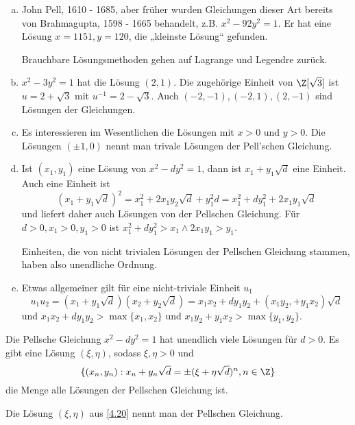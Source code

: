 \begin{nt} \label{4.19}
	\begin{enumerate}[a)]
		\item
			John Pell, 1610 - 1685, aber früher wurden Gleichungen dieser Art bereits von Brahmagupta, 1598 - 1665 behandelt, z.B. $x^2 - 92 y^2 = 1$.
			Er hat eine Lösung $x = 1151, y = 120$, die „kleinste Lösung“ gefunden.

			Brauchbare Lösungsmethoden gehen auf Lagrange und Legendre zurück.
		\item
			$x^2 - 3y^2 = 1$ hat die Lösung $(2,1)$.
			Die zugehörige Einheit von $\Z[\sqrt 3]$ ist $u = 2 + \sqrt 3$ mit $u^{-1} = 2 - \sqrt 3$.
			Auch $(-2, -1), (-2, 1), (2, -1)$ sind Lösungen der Gleichungen.
		\item
			Es interessieren im Wesentlichen die Lösungen mit $x > 0$ und $y > 0$.
			Die Lösungen $(\pm 1, 0)$ nennt man trivale Lösungen der Pell'schen Gleichung.
		\item
			Ist $(x_1, y_1)$ eine Lösung von $x^2 - dy^2 = 1$, dann ist $x_1 + y_1 \sqrt d$ eine Einheit.
			Auch eine Einheit ist
			\[
				(x_1 + y_1 \sqrt d)^2
				= x_1^2 + 2x_1 y_2 \sqrt d + y_1^2 d
				= x_1^2 + dy_1^2 + 2x_1 y_1 \sqrt d
			\]
			und liefert daher auch Lösungen von der Pellschen Gleichung.
			Für $d > 0, x_1 > 0, y_1 > 0$ ist $x_1^2 + dy_1^2 > x_1 \land 2x_1y_1 > y_1$.

			Einheiten, die von nicht trivialen Lösungen der Pellschen Gleichung stammen, haben also unendliche Ordnung.
		\item
			Etwas allgemeiner gilt für eine nicht-triviale Einheit $u_1$
			\[
				u_1 u_2 = (x_1 + y_1 \sqrt d)(x_2 + y_2 \sqrt d)
				= x_1 x_2 + dy_1 y_2 + (x_1 y_2, + y_1 x_2) \sqrt d
			\]
			und $x_1 x_2 + dy_1y_2 > \max\{x_1, x_2\}$ und $x_1y_2 + y_1 x_2 > \max \{y_1, y_2\}$.
	\end{enumerate}
\end{nt}

\begin{st} \label{4.20}
	Die Pellsche Gleichung $x^2 - dy^2 = 1$ hat unendlich viele Lösungen für $d > 0$.
	Es gibt eine Lösung $(\xi, \eta)$, sodass $\xi, \eta > 0$ und
	\[
		\{(x_n, y_n) : x_n + y_n \sqrt d = \pm (\xi + \eta \sqrt d)^n, n \in \Z \}
	\]
	die Menge alle Lösungen der Pellschen Gleichung ist.
\end{st}

\begin{df} \label{4.21}
	Die Lösung $(\xi, \eta)$ aus \ref{4.20} nennt man  der Pellschen Gleichung.
\end{df}


